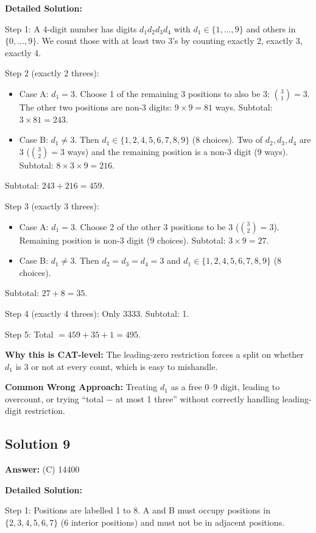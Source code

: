 \documentclass[11pt]{article}
\begin{document}
\textbf{Detailed Solution:}

Step 1: A 4-digit number has digits \( d_1 d_2 d_3 d_4 \) with \( d_1 \in \{1, \ldots, 9\} \) and others in \( \{0, \ldots, 9\} \). We count those with at least two 3's by counting exactly 2, exactly 3, exactly 4.

Step 2 (exactly 2 threes):
\begin{itemize}
\item Case A: \( d_1 = 3 \). Choose 1 of the remaining 3 positions to also be 3: \( \binom{3}{1}=3 \). The other two positions are non-3 digits: \( 9 \times 9 = 81 \) ways. Subtotal: \( 3 \times 81 = 243 \).
\item Case B: \( d_1 \neq 3 \). Then \( d_1 \in \{1,2,4,5,6,7,8,9\} \) (8 choices). Two of \( d_2, d_3, d_4 \) are 3 (\( \binom{3}{2}=3 \) ways) and the remaining position is a non-3 digit (9 ways). Subtotal: \( 8 \times 3 \times 9 = 216 \).
\end{itemize}
Subtotal: \( 243 + 216 = 459 \).

Step 3 (exactly 3 threes):
\begin{itemize}
\item Case A: \( d_1 = 3 \). Choose 2 of the other 3 positions to be 3 (\( \binom{3}{2} = 3 \)). Remaining position is non-3 digit (9 choices). Subtotal: \( 3 \times 9 = 27 \).
\item Case B: \( d_1 \neq 3 \). Then \( d_2 = d_3 = d_4 = 3 \) and \( d_1 \in \{1,2,4,5,6,7,8,9\} \) (8 choices).
\end{itemize}
Subtotal: \( 27 + 8 = 35 \).

Step 4 (exactly 4 threes): Only 3333. Subtotal: 1.

Step 5: Total \( = 459 + 35 + 1 = 495 \).

\textbf{Why this is CAT-level:} The leading-zero restriction forces a split on whether \( d_1 \) is 3 or not at every count, which is easy to mishandle.

\textbf{Common Wrong Approach:} Treating \( d_1 \) as a free 0--9 digit, leading to overcount, or trying ``total \( - \) at most 1 three'' without correctly handling leading-digit restriction.

\subsection*{Solution 9}
\textbf{Answer:} (C) 14400

\textbf{Detailed Solution:}

Step 1: Positions are labelled 1 to 8. A and B must occupy positions in \( \{2, 3, 4, 5, 6, 7\} \) (6 interior positions) and must not be in adjacent positions.
\end{document}
